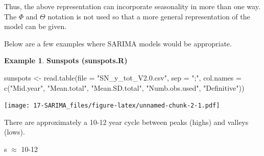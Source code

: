 \documentclass[
]{book}
\newenvironment{Shaded}{\begin{snugshade}}{\end{snugshade}}
\newcommand{\AttributeTok}[1]{\textcolor[rgb]{0.77,0.63,0.00}{#1}}
\newcommand{\DecValTok}[1]{\textcolor[rgb]{0.00,0.00,0.81}{#1}}
\newcommand{\FunctionTok}[1]{\textcolor[rgb]{0.00,0.00,0.00}{#1}}
\newcommand{\NormalTok}[1]{#1}
\newcommand{\OtherTok}[1]{\textcolor[rgb]{0.56,0.35,0.01}{#1}}
\newcommand{\SpecialCharTok}[1]{\textcolor[rgb]{0.00,0.00,0.00}{#1}}
\newcommand{\StringTok}[1]{\textcolor[rgb]{0.31,0.60,0.02}{#1}}
\theoremstyle{definition}
\theoremstyle{definition}
\newtheorem{example}{Example}[chapter]
\theoremstyle{definition}
\theoremstyle{definition}
\theoremstyle{remark}
\begin{document}
Thus, the above representation can incorporate seasonality in more than one way. The \(\Phi\) and \(\Theta\) notation is not used so that a more general representation of the model can be given.

Below are a few examples where SARIMA models would be appropriate.

\begin{example}
\textbf{Sunspots (sunspots.R)}

\begin{Shaded}
\begin{Highlighting}[]
\NormalTok{sunspots }\OtherTok{\textless{}{-}} \FunctionTok{read.table}\NormalTok{(}\AttributeTok{file =} \StringTok{"SN\_y\_tot\_V2.0.csv"}\NormalTok{, }\AttributeTok{sep =} \StringTok{";"}\NormalTok{,}
  \AttributeTok{col.names =} \FunctionTok{c}\NormalTok{(}\StringTok{"Mid.year"}\NormalTok{, }\StringTok{"Mean.total"}\NormalTok{, }\StringTok{"Mean.SD.total"}\NormalTok{, }\StringTok{"Numb.obs.used"}\NormalTok{, }\StringTok{"Definitive"}\NormalTok{))}
\end{Highlighting}
\end{Shaded}

\begin{Shaded}
\end{Shaded}

\texttt{[image: 17-SARIMA\_files/figure-latex/unnamed-chunk-2-1.pdf]}

There are approximately a 10-12 year cycle between peaks (highs) and valleys (lows).

s \(\approx\) 10-12
\end{example}
\end{document}
